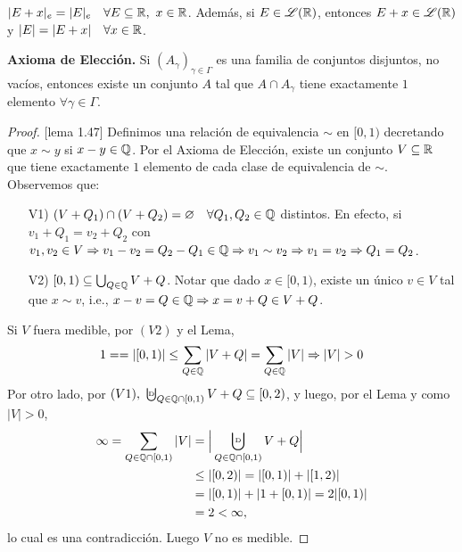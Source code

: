\begin{lemma}
	$|E + x|_{e} = |E|_{e} \quad \forall E \subseteq \mathbb{R},\ x \in \mathbb{R}$. Además, si $E \in \mathscr{L}(\mathbb{R})$, entonces $E+x \in \mathscr{L}(\mathbb{R})$ y $|E| = |E + x| \quad \forall x \in \mathbb{R}$.
\end{lemma}
\medskip
\noindent \textbf{Axioma de Elección.} Si $(A_{\gamma})_{\gamma\in\Gamma}$ es una familia de conjuntos disjuntos, no vacíos, entonces existe un conjunto $A$ tal que $A \cap A_{\gamma}$ tiene exactamente $1$ elemento $\forall \gamma \in \Gamma$.

\begin{proof}[Proof][lema 1.47]
	Definimos una relación de equivalencia $\sim$ en $[0,1)$ decretando que $x \sim y$ si $x-y \in \mathbb{Q}$. Por el Axioma de Elección, existe un conjunto $V \subseteq \mathbb{R}$ que tiene exactamente $1$ elemento de cada clase de equivalencia de $\sim$. Observemos que:
	\begin{enumerate}
		\item[V1)] $(V + Q_1) \cap (V + Q_2) = \varnothing \quad \forall Q_1,Q_2 \in \mathbb{Q}$ distintos. En efecto, si $v_1 + Q_1 = v_2 + Q_2$ con $v_1,v_2 \in V \Rightarrow v_1 - v_2 = Q_2 - Q_1 \in \mathbb{Q} \Rightarrow v_1 \sim v_2 \Rightarrow v_1 = v_2 \Rightarrow Q_1 = Q_2$.

		\item[V2)] $[0,1) \subseteq \bigcup_{Q \in \mathbb{Q}} V + Q$. Notar que dado $x\in[0,1)$, existe un único $v \in V$ tal que $x \sim v$, i.e., $x-v = Q \in \mathbb{Q} \Rightarrow x = v + Q \in V + Q$.
	\end{enumerate}
	Si $V$ fuera medible, por $(V2)$ y el Lema,
	\[ 1 = = |[0,1)| \leq \sum_{Q \in \mathbb{Q}} |V+Q| = \sum_{Q\in\mathbb{Q}} |V| \Rightarrow |V| > 0 \]
	Por otro lado, por $(V1),\ \textbigcupd_{Q \in \Q \cap [0,1)} V+Q \subseteq [0,2)$, y luego, por el Lema y como $|V| > 0$,
	\begin{align*}
		\infty = \sum_{Q \in \Q \cap [0,1)} |V| &= \Big| \bigcupd_{Q\in\Q\cap[0,1)} V+Q \Big| \\
		& \leq |[0,2)| = |[0,1)| + |[1,2)| \\
		&= |[0,1)| + | 1 + [0,1)| = 2|[0,1)| \\
		&= 2 < \infty
	,\end{align*}
	lo cual es una contradicción. Luego $V$ no es medible.
\end{proof}
